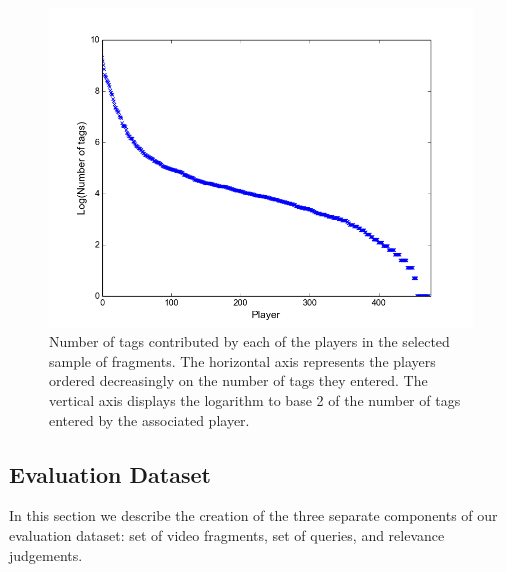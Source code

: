 \begin{figure}[t]
\centering
\includegraphics[scale=.4]{ecirnumtagsperplayer} 
\caption{Number of tags contributed by each of the players in the selected sample of fragments. The horizontal axis represents the players ordered decreasingly on the number of tags they entered. The vertical axis displays the logarithm to base 2 of the number of tags entered by the associated player.}
\label{numtagsperplayer}
\end{figure}

\subsection{Evaluation Dataset}\label{sec:eval-dataset}
In this section we describe the creation of the three separate components of our evaluation dataset: set of video fragments, set of queries, and relevance judgements.
